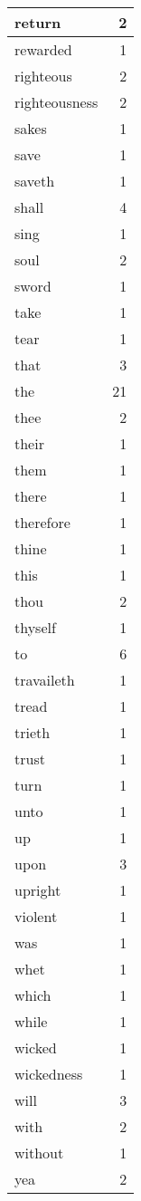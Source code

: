 \begin{center}
\begin{longtable}{l|r}
return & 2 \\ \hline
rewarded & 1 \\ \hline
righteous & 2 \\ \hline
righteousness & 2 \\ \hline
sakes & 1 \\ \hline
save & 1 \\ \hline
saveth & 1 \\ \hline
shall & 4 \\ \hline
sing & 1 \\ \hline
soul & 2 \\ \hline
sword & 1 \\ \hline
take & 1 \\ \hline
tear & 1 \\ \hline
that & 3 \\ \hline
the & 21 \\ \hline
thee & 2 \\ \hline
their & 1 \\ \hline
them & 1 \\ \hline
there & 1 \\ \hline
therefore & 1 \\ \hline
thine & 1 \\ \hline
this & 1 \\ \hline
thou & 2 \\ \hline
thyself & 1 \\ \hline
to & 6 \\ \hline
travaileth & 1 \\ \hline
tread & 1 \\ \hline
trieth & 1 \\ \hline
trust & 1 \\ \hline
turn & 1 \\ \hline
unto & 1 \\ \hline
up & 1 \\ \hline
upon & 3 \\ \hline
upright & 1 \\ \hline
violent & 1 \\ \hline
was & 1 \\ \hline
whet & 1 \\ \hline
which & 1 \\ \hline
while & 1 \\ \hline
wicked & 1 \\ \hline
wickedness & 1 \\ \hline
will & 3 \\ \hline
with & 2 \\ \hline
without & 1 \\ \hline
yea & 2 \\ \hline
\end{longtable}
\end{center}



